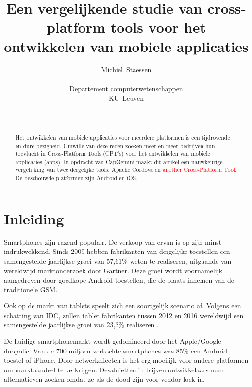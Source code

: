 \documentclass[a4paper]{IEEEconf}
\newcommand{\anotherCPT}{\textcolor{red}{another Cross-Platform Tool}}
\begin{document}
\title{Een vergelijkende studie van cross-platform tools voor het ontwikkelen van mobiele applicaties}
\author{
    Michiel~Staessen \\
    \begin{affiliation}
       Departement computerwetenschappen\\
       KU~Leuven\\
    \end{affiliation} \\
}
\maketitle

\begin{abstract}
Het ontwikkelen van mobiele applicaties voor meerdere platformen is een tijdrovende en dure bezigheid. Omwille van deze reden zoeken meer en meer bedrijven hun toevlucht in Cross-Platform Tools (CPT's) voor het ontwikkelen van mobiele applicaties (apps). In opdracht van CapGemini maakt dit artikel een nauwkeurige vergelijking van twee dergelijke tools: Apache Cordova en \anotherCPT. De beschouwde platformen zijn Android en iOS.
\end{abstract}

\section{Inleiding}

Smartphones zijn razend populair. De verkoop van ervan is op zijn minst indrukwekkend. Sinds 2009 hebben fabrikanten van dergelijke toestellen een samengestelde jaarlijkse groei van 57,61\% weten te realiseren, uitgaande van wereldwijd marktonderzoek door Gartner. Deze groei wordt voornamelijk aangedreven door goedkope Android toestellen, die de plaats innemen van de traditionele GSM. 

Ook op de markt van tablets speelt zich een soortgelijk scenario af. Volgens een schatting van IDC, zullen tablet fabrikanten tussen 2012 en 2016 wereldwijd een samengestelde jaarlijkse groei van 23,3\% realiseren \cite{IDC:201205}.

De huidige smartphonemarkt wordt gedomineerd door het Apple/Google duopolie. Van de 700 miljoen verkochte smartphones was 85\% een Android toestel of iPhone. Door netwerkeffecten is het erg moeilijk voor andere platformen om marktaandeel te verkrijgen. Desalniettemin blijven ontwikkelaars naar alternatieven zoeken omdat ze als de dood zijn voor vendor lock-in. \cite{VM_DE:2013}
\end{document}
